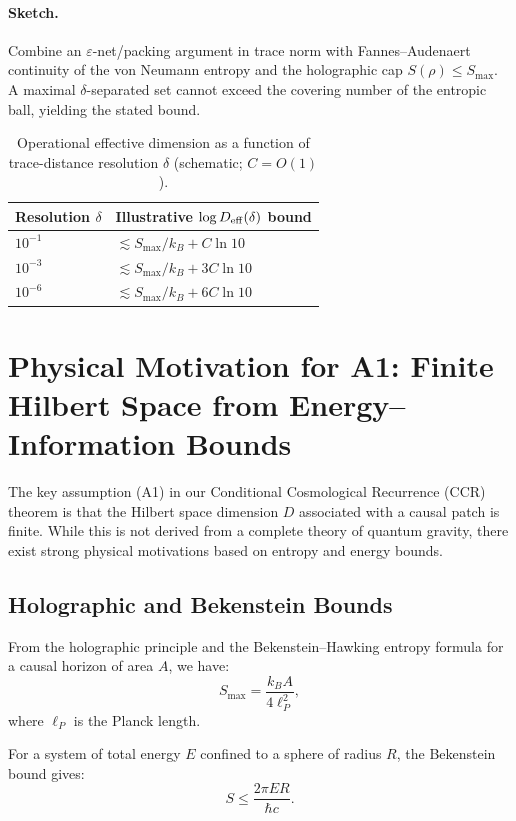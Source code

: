 \documentclass[12pt]{article}
\newcommand{\Smax}{S_{\max}}
\theoremstyle{remark}
\begin{document}
\paragraph{Sketch.} Combine an $\varepsilon$-net/packing argument in trace norm with Fannes--Audenaert continuity of the von Neumann entropy and the holographic cap $S(\rho)\le \Smax$. A maximal $\delta$-separated set cannot exceed the covering number of the entropic ball, yielding the stated bound.

\begin{table}[H]
  \centering
  \begin{tabular}{l l}
    \hline
    Resolution $\delta$ & Illustrative $\log D_{\rm eff}(\delta)$ bound \\
    \hline
    $10^{-1}$ & $\lesssim \Smax/k_B + C\ln 10$ \\
    $10^{-3}$ & $\lesssim \Smax/k_B + 3C\ln 10$ \\
    $10^{-6}$ & $\lesssim \Smax/k_B + 6C\ln 10$ \\
    \hline
  \end{tabular}
  \caption{Operational effective dimension as a function of trace-distance resolution $\delta$ (schematic; $C=O(1)$).}
  \label{tab:Deff}
\end{table}


\section{Physical Motivation for A1: Finite Hilbert Space from Energy--Information Bounds}
\label{sec:motivation_A1}

The key assumption (A1) in our Conditional Cosmological Recurrence (CCR) theorem is that the Hilbert space dimension \(D\) associated with a causal patch is finite. While this is not derived from a complete theory of quantum gravity, there exist strong physical motivations based on entropy and energy bounds.

\subsection{Holographic and Bekenstein Bounds}
From the holographic principle and the Bekenstein--Hawking entropy formula for a causal horizon of area \(A\), we have:
\begin{equation}
\Smax = \frac{k_B A}{4 \ell_P^2},
\end{equation}
where \(\ell_P\) is the Planck length.

For a system of total energy \(E\) confined to a sphere of radius \(R\), the Bekenstein bound gives:
\begin{equation}
S \le \frac{2\pi E R}{\hbar c}.
\end{equation}
\end{document}
